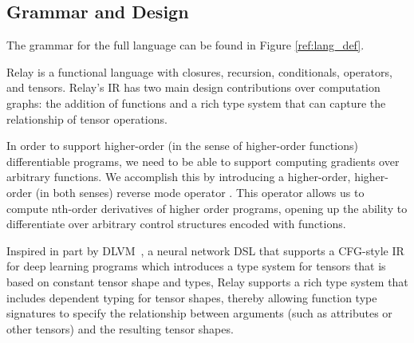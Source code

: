 \subsection{Grammar and Design}

The grammar for the full language can be found in Figure \ref{ref:lang_def}.

Relay is a functional language with closures, recursion, conditionals, operators,
and tensors. Relay's IR has two main design contributions over computation graphs:
the addition of functions and a rich type system that can capture the relationship
of tensor operations.

In order to support higher-order (in the sense of higher-order functions) differentiable
programs, we need to be able to support computing gradients over arbitrary
functions. We accomplish this by introducing a higher-order, higher-order (in
both senses) reverse mode operator \cite{toplas_reverse}. This operator allows
us to compute nth-order derivatives of higher order programs, opening up the
ability to differentiate over arbitrary control structures encoded with
functions.

Inspired in part by DLVM~\cite{dlvm}, a neural network DSL that supports a
CFG-style IR for deep learning programs which introduces a type system for
tensors that is based on constant tensor shape and types, Relay supports a rich
type system that includes dependent typing for tensor shapes, thereby allowing
function type signatures to specify the relationship between arguments (such as
attributes or other tensors) and the resulting tensor shapes.
